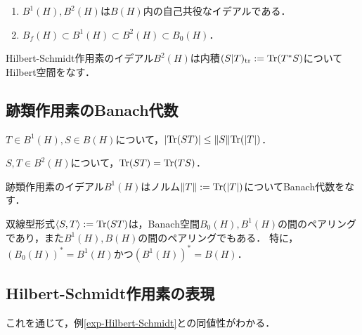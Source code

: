 \documentclass[uplatex,dvipdfmx]{jsreport}
\begin{document}
\begin{proposition}\mbox{}
    \begin{enumerate}
        \item $B^1(H),B^2(H)$は$B(H)$内の自己共役なイデアルである．
        \item $B_f(H)\subset B^1(H)\subset B^2(H)\subset B_0(H)$．
    \end{enumerate}
\end{proposition}

\begin{theorem}
    Hilbert-Schmidt作用素のイデアル$B^2(H)$は内積$(S|T)_{\operatorname{\mathrm{tr}}}:=\mathrm{Tr}(T^*S)$についてHilbert空間をなす．
\end{theorem}

\subsection{跡類作用素のBanach代数}

\begin{lemma}
    $T\in B^1(H),S\in B(H)$について，$\lvert\mathrm{Tr}(ST)\rvert\le\|S\|\mathrm{Tr}(\lvert T\rvert)$．
\end{lemma}

\begin{lemma}
    $S,T\in B^2(H)$について，$\mathrm{Tr}(ST)=\mathrm{Tr}(TS)$．
\end{lemma}

\begin{theorem}
    跡類作用素のイデアル$B^1(H)$はノルム$\|T\|:=\mathrm{Tr}(\lvert T\rvert)$についてBanach代数をなす．
\end{theorem}

\begin{theorem}
    双線型形式$\langle S,T\rangle:=\mathrm{Tr}(ST)$は，Banach空間$B_0(H),B^1(H)$の間のペアリングであり，また$B^1(H),B(H)$の間のペアリングでもある．
    特に，$(B_0(H))^*=B^1(H)$かつ$(B^1(H))^*=B(H)$．
\end{theorem}

\subsection{Hilbert-Schmidt作用素の表現}

\begin{tcolorbox}[colframe=ForestGreen, colback=ForestGreen!10!white,breakable,colbacktitle=ForestGreen!40!white,coltitle=black,fonttitle=\bfseries\sffamily,
title=]
    これを通じて，例\ref{exp-Hilbert-Schmidt}との同値性がわかる．
\end{tcolorbox}
\end{document}
